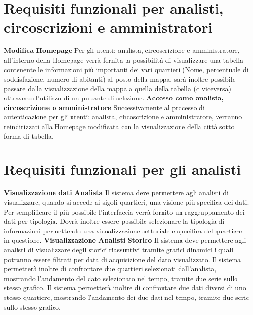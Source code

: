     \section{Requisiti funzionali per analisti, circoscrizioni e amministratori}
        \begin{rfList}
            \rfItem \textbf{Modifica Homepage} Per gli utenti: analista, circoscrizione e amministratore, all'interno della Homepage verrà fornita la possibilità di visualizzare una tabella contenente le informazioni più importanti dei vari quartieri (Nome, percentuale di soddisfazione, numero di abitanti) al posto della mappa, sarà inoltre possibile passare dalla visualizzazione della mappa a quella della tabella (o viceversa) attraverso l'utilizzo di un pulsante di selezione.
            \rfItem \textbf{Accesso come analista, circoscrizione o amministratore} Successivamente al processo di autenticazione per gli utenti: analista, circoscrizione e amministratore, verranno reindirizzati alla Homepage modificata con la visualizzazione della città sotto forma di tabella.
        \end{rfList}
    \section{Requisiti funzionali per gli analisti}
        \begin{rfList}
            \rfItem \textbf{Visualizzazione dati Analista} Il sistema deve permettere agli analisti di visualizzare, quando si accede ai sigoli quartieri, una visione più specifica dei dati. Per semplificare il più possibile l'interfaccia verrà fornito un raggruppamento dei dati per tipologia. Dovrà inoltre essere possibile selezionare la tipologia di informazioni permettendo una visualizzazione settoriale e specifica del quartiere in questione.
            \rfItem \textbf{Visualizzazione Analisti Storico} Il sistema deve permettere agli analisti di visualizzare degli storici riassuntivi tramite grafici dinamici i quali potranno essere filtrati per data di acquisizione del dato visualizzato. Il sistema permetterà inoltre di confrontare due quartieri selezionati dall'analista, mostrando l'andamento del dato selezionato nel tempo, tramite due serie sullo stesso grafico. Il sistema permetterà inoltre di confrontare due dati diversi di uno stesso quartiere, mostrando l'andamento dei due dati nel tempo, tramite due serie sullo stesso grafico. 
        \end{rfList}
